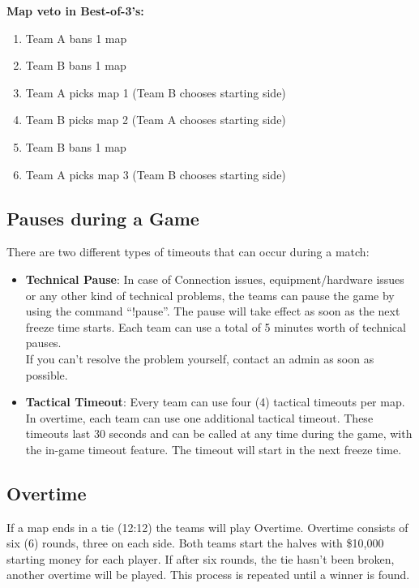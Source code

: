 \documentclass{article}
\newcommand{\TeamA}{{\color{red}Team A }}
\newcommand{\TeamB}{{\color{blue}Team B }}
\begin{document}
\textbf{Map veto in Best-of-3's:}
\begin{enumerate}
    \item \TeamA bans 1 map
    \item \TeamB bans 1 map
    \item \TeamA picks map 1 (\TeamB chooses starting side)
    \item \TeamB picks map 2 (\TeamA chooses starting side)
    \item \TeamB bans 1 map
    \item \TeamA picks map 3 (\TeamB chooses starting side)
\end{enumerate}

\subsection{Pauses during a Game}
There are two different types of timeouts that can occur during a match:
\begin{itemize}
    \item \textbf{Technical Pause}: In case of Connection issues, equipment/hardware issues or any other kind of technical problems, the teams can pause the game by using the command “!pause”. The pause will take effect as soon as the next freeze time starts. Each team can use a total of 5 minutes worth of technical pauses.\\
    If you can't resolve the problem yourself, contact an admin as soon as possible.
    \item \textbf{Tactical Timeout}: Every team can use four (4) tactical timeouts per map. In overtime, each team can use one additional tactical timeout. These timeouts last 30 seconds and can be called at any time during the game, with the in-game timeout feature. The timeout will start in the next freeze time.

\end{itemize}

\subsection{Overtime}
If a map ends in a tie (12:12) the teams will play Overtime. Overtime consists of six (6) rounds, three on each side. Both teams
start the halves with \$10,000 starting money for each player. If after six rounds, the tie hasn't been broken, another overtime will be played. This process is repeated until a winner is found. 
\end{document}
